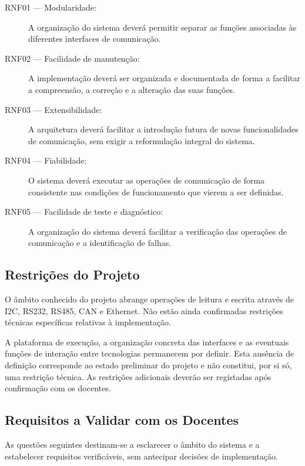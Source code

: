 \begin{description}
    \item[RNF01 --- Modularidade:]
    A organização do sistema deverá permitir separar as funções associadas
    às diferentes interfaces de comunicação.

    \item[RNF02 --- Facilidade de manutenção:]
    A implementação deverá ser organizada e documentada de forma a
    facilitar a compreensão, a correção e a alteração das suas funções.

    \item[RNF03 --- Extensibilidade:]
    A arquitetura deverá facilitar a introdução futura de novas
    funcionalidades de comunicação, sem exigir a reformulação integral
    do sistema.

    \item[RNF04 --- Fiabilidade:]
    O sistema deverá executar as operações de comunicação de forma
    consistente nas condições de funcionamento que vierem a ser definidas.

    \item[RNF05 --- Facilidade de teste e diagnóstico:]
    A organização do sistema deverá facilitar a verificação das operações
    de comunicação e a identificação de falhas.
\end{description}

\subsection{Restrições do Projeto}

O âmbito conhecido do projeto abrange operações de leitura e escrita
através de I2C, RS232, RS485, CAN e Ethernet. Não estão ainda confirmadas
restrições técnicas específicas relativas à implementação.

A plataforma de execução, a organização concreta das interfaces e as
eventuais funções de interação entre tecnologias permanecem por definir.
Esta ausência de definição corresponde ao estado preliminar do projeto
e não constitui, por si só, uma restrição técnica. As restrições
adicionais deverão ser registadas após confirmação com os docentes.

\subsection{Requisitos a Validar com os Docentes}

As questões seguintes destinam-se a esclarecer o âmbito do sistema e
a estabelecer requisitos verificáveis, sem antecipar decisões de
implementação.

